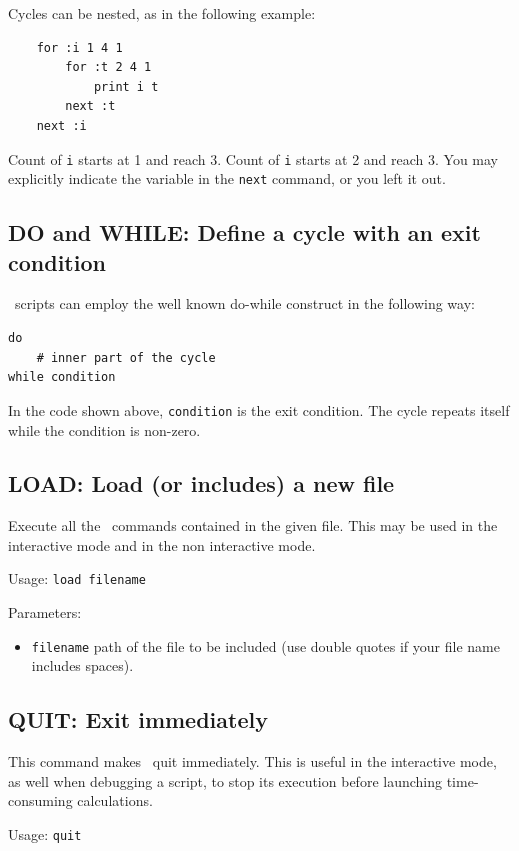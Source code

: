     Cycles can be nested, as in the following example:
    
    \begin{lstlisting}
    for :i 1 4 1
        for :t 2 4 1
            print i t
        next :t
    next :i
    \end{lstlisting}
    
    Count of \lstinline{i} starts at 1 and reach 3. Count of \lstinline{i} starts at 2 and reach 3. You may explicitly indicate the variable in the 
    \lstinline!next! command, or you left it out.

\subsection{DO and WHILE: Define a cycle with an exit condition}
    \Afmm\ scripts can employ the well known do-while construct in the following way:

\begin{lstlisting}
do
    # inner part of the cycle
while condition
\end{lstlisting}

In the code shown above, \lstinline!condition! is the exit condition. The cycle repeats itself while the condition is non-zero.

\subsection{LOAD: Load (or includes) a new file}
\label{subsec_load}
    Execute all the \afmm\ commands contained in the given file. This
    may be used in the interactive mode and in the non interactive mode.
    
    Usage: \lstinline!load filename!
    
    Parameters:
    \begin{itemize}
    \item \lstinline{filename} path of the file to be included (use double quotes if your file name includes spaces).
    \end{itemize}
    
    
\subsection{QUIT: Exit immediately}
    This command makes \afmm\ quit immediately. This is useful in the interactive mode, as well when debugging a script, to stop its execution before launching time-consuming calculations.

    Usage: \lstinline!quit!

